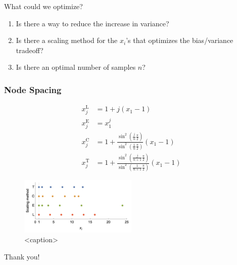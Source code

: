 \documentclass[11pt,aspectratio=1610,xcolor=dvipsnames]{beamer}
\begin{document}
\begin{frame}{What could we optimize?}
	\begin{enumerate}
		\item Is there a way to reduce the increase in variance?
		\item Is there a scaling method for the $x_i$'s that optimizes the bias/variance tradeoff?
		\item Is there an optimal number of samples $n$?
	\end{enumerate}
\end{frame}

\begin{frame}
	\frametitle{Node Spacing}

	\begin{align*}
		x_j^\mathrm{L} & = 1 + j(x_1 - 1)                                                                             \\
		x_j^\mathrm{E} & = x_1^j                                                                                      \\
		x_j^\mathrm{C} & = 1 + \frac{\sin^2(\frac{j}{n}\frac{\pi}{2})}{\sin^2(\frac{1}{n}\frac{\pi}{2})}(x_1 - 1)     \\
		x_j^\mathrm{T} & = 1 + \frac{\sin^2(\frac{j}{n+1}\frac{\pi}{2})}{\sin^2(\frac{1}{n+1}\frac{\pi}{2})}(x_1 - 1)
	\end{align*}
	\begin{figure}[h]
		\centering
		\includegraphics[width=0.5\textwidth]{spacing.png}
		\caption{<caption>}
		\label{<label>}
	\end{figure}

\end{frame}


\begin{frame}[standout]
	Thank you!
\end{frame}
\end{document}
